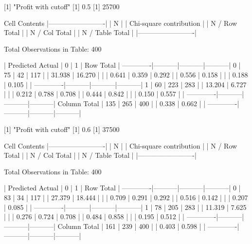 \documentclass{article}
\begin{document}
\begin{Schunk}
\begin{Soutput}
 
[1] "Profit with cutoff"
[1] 0.5
[1] 25700

 
   Cell Contents
|-------------------------|
|                       N |
| Chi-square contribution |
|           N / Row Total |
|           N / Col Total |
|         N / Table Total |
|-------------------------|

 
Total Observations in Table:  400 

 
             | Predicted 
      Actual |         0 |         1 | Row Total | 
-------------|-----------|-----------|-----------|
           0 |        75 |        42 |       117 | 
             |    31.938 |    16.270 |           | 
             |     0.641 |     0.359 |     0.292 | 
             |     0.556 |     0.158 |           | 
             |     0.188 |     0.105 |           | 
-------------|-----------|-----------|-----------|
           1 |        60 |       223 |       283 | 
             |    13.204 |     6.727 |           | 
             |     0.212 |     0.788 |     0.708 | 
             |     0.444 |     0.842 |           | 
             |     0.150 |     0.557 |           | 
-------------|-----------|-----------|-----------|
Column Total |       135 |       265 |       400 | 
             |     0.338 |     0.662 |           | 
-------------|-----------|-----------|-----------|

 
[1] "Profit with cutoff"
[1] 0.6
[1] 37500

 
   Cell Contents
|-------------------------|
|                       N |
| Chi-square contribution |
|           N / Row Total |
|           N / Col Total |
|         N / Table Total |
|-------------------------|

 
Total Observations in Table:  400 

 
             | Predicted 
      Actual |         0 |         1 | Row Total | 
-------------|-----------|-----------|-----------|
           0 |        83 |        34 |       117 | 
             |    27.379 |    18.444 |           | 
             |     0.709 |     0.291 |     0.292 | 
             |     0.516 |     0.142 |           | 
             |     0.207 |     0.085 |           | 
-------------|-----------|-----------|-----------|
           1 |        78 |       205 |       283 | 
             |    11.319 |     7.625 |           | 
             |     0.276 |     0.724 |     0.708 | 
             |     0.484 |     0.858 |           | 
             |     0.195 |     0.512 |           | 
-------------|-----------|-----------|-----------|
Column Total |       161 |       239 |       400 | 
             |     0.403 |     0.598 |           | 
-------------|-----------|-----------|-----------|


\end{Soutput}
\end{Schunk}
\end{document}
